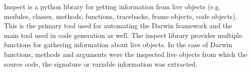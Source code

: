 Inspect is a python library for getting information from live objects (e.g. modules, classes, methods, functions, tracebacks, frame objects, code objects).
This is the primary tool used for automating the Darwin framework and the main tool used in code generation as well. The inspect library provides multiple
functions for gathering information about live objects. In the case of Darwin functions, methods and arguments were the inspected live objects from which the source
code, the signature or variable information was extracted.